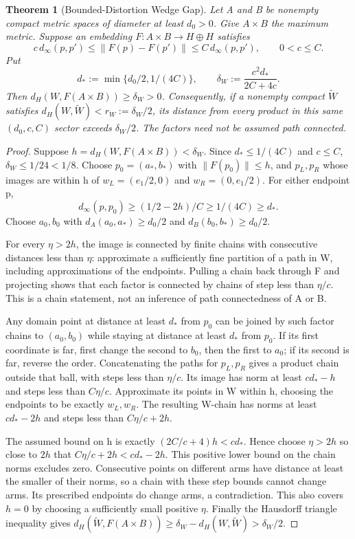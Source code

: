 \documentclass[11pt,a4paper]{article}
\theoremstyle{plain}
\newtheorem{theorem}{Theorem}[section]
\theoremstyle{definition}
\theoremstyle{remark}
\begin{document}
\begin{theorem}[Bounded-Distortion Wedge Gap]\label{thm:wedge-bilipschitz-gap}
Let A and B be nonempty compact metric spaces of diameter at least $d_0>0$.
Give $A\times B$ the maximum metric. Suppose an embedding
$F:A\times B\to H\oplus H$ satisfies
\[
 c\,d_\infty(p,p')\le\|F(p)-F(p')\|\le C\,d_\infty(p,p'),
 \qquad 0<c\le C.
\]
Put
\[
 d_*:=\min\{d_0/2,1/(4C)\},\qquad
 \delta_W:=\frac{c^2d_*}{2C+4c}.
\]
Then $d_H(W,F(A\times B))\ge\delta_W>0$. Consequently, if a nonempty compact
$\widetilde W$ satisfies $d_H(W,\widetilde W)<r_W:=\delta_W/2$, its distance
from every product in this same $(d_0,c,C)$ sector exceeds $\delta_W/2$.
The factors need not be assumed path connected.
\end{theorem}
\begin{proof}
Suppose $h=d_H(W,F(A\times B))<\delta_W$. Since $d_*\le1/(4C)$ and $c\le C$,
$\delta_W\le1/24<1/8$. Choose $p_0=(a_*,b_*)$ with $\|F(p_0)\|\le h$,
and $p_L,p_R$ whose images are within h of
$w_L=(e_1/2,0)$ and $w_R=(0,e_1/2)$. For either endpoint p,
\[
 d_\infty(p,p_0)\ge(1/2-2h)/C\ge1/(4C)\ge d_*.
\]
Choose $a_0,b_0$ with $d_A(a_0,a_*)\ge d_0/2$ and
$d_B(b_0,b_*)\ge d_0/2$.

For every $\eta>2h$, the image is connected by finite chains with consecutive
distances less than $\eta$: approximate a sufficiently fine partition of a
path in W, including approximations of the endpoints. Pulling a chain back
through F and projecting shows that each factor is connected by chains of
step less than $\eta/c$. This is a chain statement, not an inference of path
connectedness of A or B.

Any domain point at distance at least $d_*$ from $p_0$ can be joined by such
factor chains to $(a_0,b_0)$ while staying at distance at least $d_*$ from
$p_0$. If its first coordinate is far, first change the second to $b_0$, then
the first to $a_0$; if its second is far, reverse the order. Concatenating
the paths for $p_L,p_R$ gives a product chain outside that ball, with steps
less than $\eta/c$. Its image has norm at least $cd_*-h$ and steps less than
$C\eta/c$. Approximate its points in W within h, choosing the endpoints to
be exactly $w_L,w_R$. The resulting W-chain has norms at least $cd_*-2h$
and steps less than $C\eta/c+2h$.

The assumed bound on h is exactly
$(2C/c+4)h<cd_*$. Hence choose $\eta>2h$ so close to $2h$ that
$C\eta/c+2h<cd_*-2h$. This positive lower bound on the chain norms excludes
zero. Consecutive points on different arms have distance at least the smaller
of their norms, so a chain with these step bounds cannot change arms.
Its prescribed endpoints do change arms, a contradiction. This also covers
$h=0$ by choosing a sufficiently small positive $\eta$.
Finally the Hausdorff triangle inequality gives
$d_H(\widetilde W,F(A\times B))\ge\delta_W-d_H(W,\widetilde W)>\delta_W/2$.
\end{proof}
\end{document}
